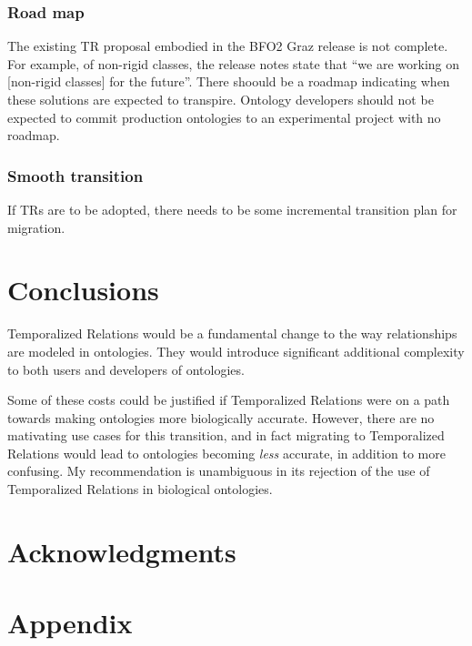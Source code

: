 \documentclass{bioinfo}
\begin{document}
\subsubsection{Road map} The existing TR proposal embodied in the BFO2
Graz release is not complete. For example, of non-rigid classes, the
release notes state that ``we are working on [non-rigid classes] for
the future''. There shoould be a roadmap indicating when these
solutions are expected to transpire. Ontology developers should not be
expected to commit production ontologies to an experimental project
with no roadmap.

\subsubsection{Smooth transition} If TRs are to be adopted, there
needs to be some incremental transition plan for migration.

\section{Conclusions}

Temporalized Relations would be a fundamental change to the way
relationships are modeled in ontologies. They would introduce
significant additional complexity to both users and developers of
ontologies.

Some of these costs could be justified if Temporalized Relations were
on a path towards making ontologies more biologically
accurate. However, there are no mativating use cases for this
transition, and in fact migrating to Temporalized Relations would lead
to ontologies becoming \emph{less} accurate, in addition to more
confusing. My recommendation is unambiguous in its rejection of the
use of Temporalized Relations in biological ontologies.

\section*{Acknowledgments}







\newpage
\section*{Appendix}
\end{document}
